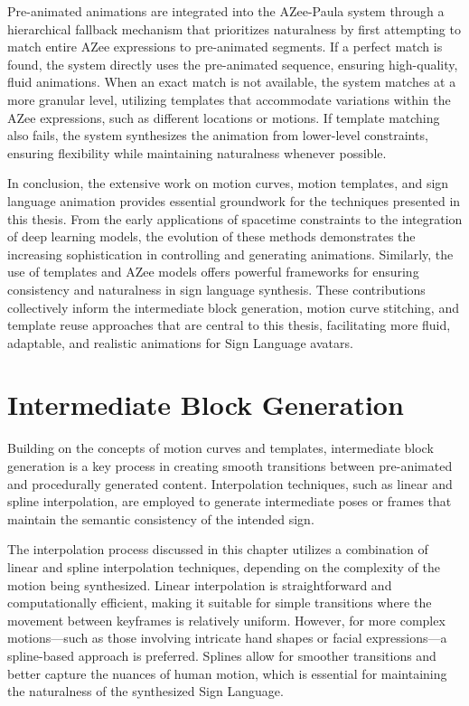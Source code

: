\documentclass[../../main.tex]{subfiles}
\begin{document}
Pre-animated animations are integrated into the AZee-Paula system through a hierarchical fallback mechanism that prioritizes naturalness by first attempting to match entire AZee expressions to pre-animated segments. If a perfect match is found, the system directly uses the pre-animated sequence, ensuring high-quality, fluid animations. When an exact match is not available, the system matches at a more granular level, utilizing templates that accommodate variations within the AZee expressions, such as different locations or motions. If template matching also fails, the system synthesizes the animation from lower-level constraints, ensuring flexibility while maintaining naturalness whenever possible.

In conclusion, the extensive work on motion curves, motion templates, and sign language animation provides essential groundwork for the techniques presented in this thesis. From the early applications of spacetime constraints to the integration of deep learning models, the evolution of these methods demonstrates the increasing sophistication in controlling and generating animations. Similarly, the use of templates and AZee models offers powerful frameworks for ensuring consistency and naturalness in sign language synthesis. These contributions collectively inform the intermediate block generation, motion curve stitching, and template reuse approaches that are central to this thesis, facilitating more fluid, adaptable, and realistic animations for Sign Language avatars.

\section{Intermediate Block Generation}

Building on the concepts of motion curves and templates, intermediate block generation is a key process in creating smooth transitions between pre-animated and procedurally generated content. Interpolation techniques, such as linear and spline interpolation, are employed to generate intermediate poses or frames that maintain the semantic consistency of the intended sign.

The interpolation process discussed in this chapter utilizes a combination of linear and spline interpolation techniques, depending on the complexity of the motion being synthesized. Linear interpolation is straightforward and computationally efficient, making it suitable for simple transitions where the movement between keyframes is relatively uniform. However, for more complex motions—such as those involving intricate hand shapes or facial expressions—a spline-based approach is preferred. Splines allow for smoother transitions and better capture the nuances of human motion, which is essential for maintaining the naturalness of the synthesized Sign Language.
\end{document}
